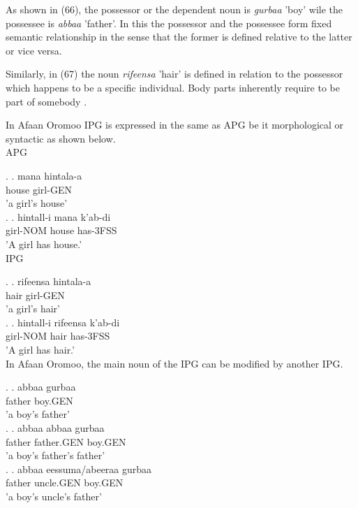 \documentclass[11pt,a4paper]{article}
\begin{document}
	As shown in (66), the possessor or the dependent noun is \emph{gurbaa} 'boy' wile the possessee is \emph{abbaa} 'father'. In this the possessor and the possessee form fixed semantic relationship in the sense that the former is defined relative to the latter or vice versa. 
	
	Similarly, in (67) the noun \emph{rifeensa} 'hair' is defined in relation to the possessor which happens to be a specific individual. Body parts inherently require to be part of somebody \cite[161]{gebregziabher2012alienable}.
	
	In Afaan Oromoo IPG is expressed in the same as APG be it morphological or syntactic as shown below. \\
	
	APG
	
	\ex.
	\ag.
	mana hintala-a\\
	house girl-GEN\\
	'a girl's house'\\
	
	\ex.
	\ag.
	hintall-i mana k'ab-di\\
	girl-NOM house has-3FSS\\
	'A girl has house.'\\
	
	IPG
	
	\ex.
	\ag.
	rifeensa hintala-a\\
	hair girl-GEN\\
	'a girl's hair'\\
	
	\ex.
	\ag.
	hintall-i rifeensa k'ab-di\\
	girl-NOM hair has-3FSS\\
	'A girl has hair.'\\
	
	In Afaan Oromoo, the main noun of the IPG can be modified by another IPG.
	
	\ex.
	\ag.
	abbaa gurbaa\\
	father boy.GEN\\
	'a boy's father'\\
	
	\ex.
	\ag.
	abbaa abbaa gurbaa\\
	father father.GEN boy.GEN\\
	'a boy's father's father'\\
	
	\ex.
	\ag.
	abbaa eessuma/abeeraa gurbaa\\
	father uncle.GEN boy.GEN\\
	'a boy's uncle's father'\\
	
\end{document}
